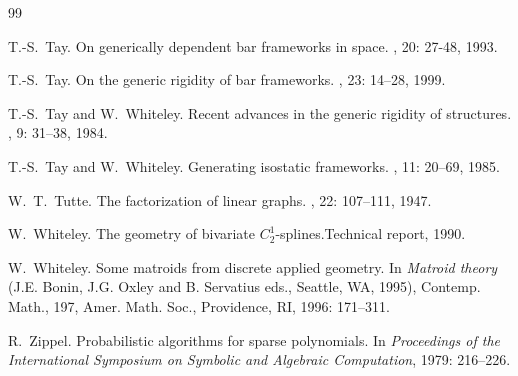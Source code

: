 \documentclass{daj}
\begin{document}
\begin{thebibliography}{99}

 T.-S.~Tay. 
\newblock  On generically dependent bar frameworks in space.
, 20: 27-48, 1993.



  T.-S.~Tay. 
\newblock  On the generic rigidity of bar frameworks.
, 23: 14--28, 1999.



 T.-S.~Tay and W.~Whiteley. 
\newblock  Recent advances in the generic rigidity of structures.
, 9:
31--38, 1984.

 T.-S.~Tay and W.~Whiteley. 
\newblock  Generating  isostatic frameworks.
, 11: 20--69,  1985.

 W.~T.~Tutte. 
\newblock  The factorization of linear graphs.
, 22: 107--111, 1947.

W.~Whiteley. 
\newblock  The geometry of bivariate $C^1_2$-splines.Technical report, 1990.





 {W.~Whiteley}. 
\newblock 
Some matroids from discrete applied geometry. In {\em Matroid theory} (J.E. Bonin, J.G. Oxley and B. Servatius eds.,
Seattle, WA, 1995),
Contemp. Math., 197, Amer. Math. Soc., Providence, RI, 1996: 171--311.

 R.~Zippel. 
\newblock  Probabilistic algorithms for sparse polynomials.
In {\em   Proceedings of the International Symposium on Symbolic and Algebraic Computation},  1979: 216--226.




\end{thebibliography}
\end{document}
